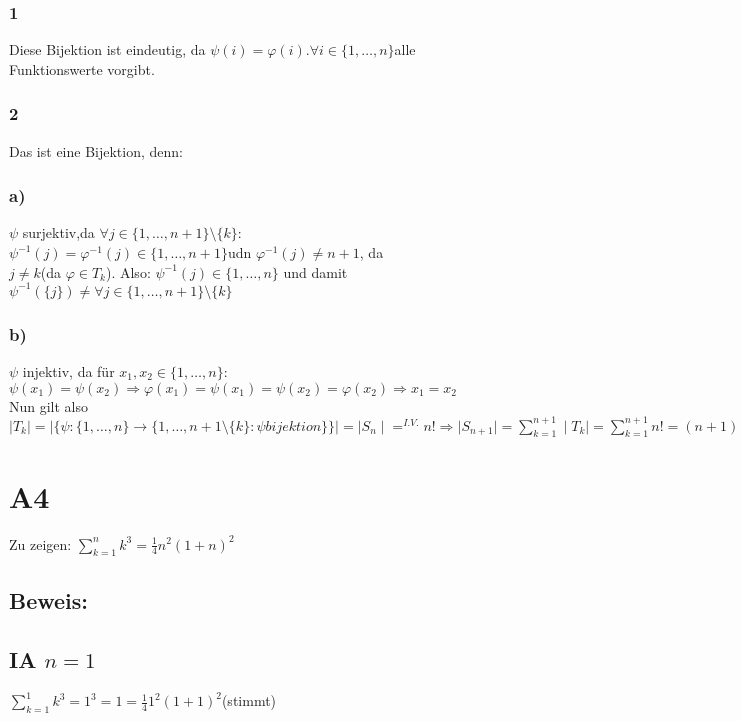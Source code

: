 \documentclass[11pt]{scrartcl}
\begin{document}
\subsubsection*{1}
Diese Bijektion ist eindeutig, da $\psi (i) = \varphi (i)$.$\forall i \in \{1, \dots,n\}$alle Funktionswerte vorgibt.
\subsubsection*{2}
Das ist eine Bijektion, denn:

\subsubsection*{a)}
$\psi$ surjektiv,da $\forall j \in \{1, \dots,n+1\} \setminus \{k\} $: \\
$\psi^{-1} (j) = \varphi^{-1} (j) \in \{1, \dots , n+1\}$udn $\varphi^{-1} (j) \neq n+1$, da \\
$j \neq k$(da $\varphi \in  T_k$). Also: $\psi^{-1} (j) \in \{1, \dots, n\}$ und damit \\ $\psi^{-1} (\{j\}) \neq \forall j \in\{1, \dots,n+1\} \setminus \{k\} $ 


\subsubsection*{b)}
$\psi$ injektiv, da für $x_1 ,x_2 \in \{1,\dots,n\}$:$\psi (x_1) = \psi (x_2) \Rightarrow \varphi (x_1) = \psi (x_1) = \psi (x_2) = \varphi (x_2) \Rightarrow x_1 = x_2$ \\

Nun gilt also \\

$\mid T_k \mid = \mid \{ \psi : \{1,\dots,n\} \rightarrow \{1,\dots,n+1 \setminus \{k\} : \psi bijektion\} \} \mid = \mid S_n \mid =^{I.V.} n! \Rightarrow \mid S_{n+1} \mid = \sum\limits_{k=1}^{n+1} \mid T_k \mid = \sum\limits_{k=1}^{n+1} n! = (n+1)*n! = (n+1)!$

\section{A4}
Zu zeigen: $\sum\limits_{k=1}^n k^3 = \frac{1}{4} n^2 (1+n)^2$
\subsection*{Beweis: }
\subsection*{IA $n=1$}
$\sum\limits_{k=1}^1 k^3 = 1^3 = 1 = \frac{1}{4} 1^2 (1+1)^2$(stimmt)
\end{document}
